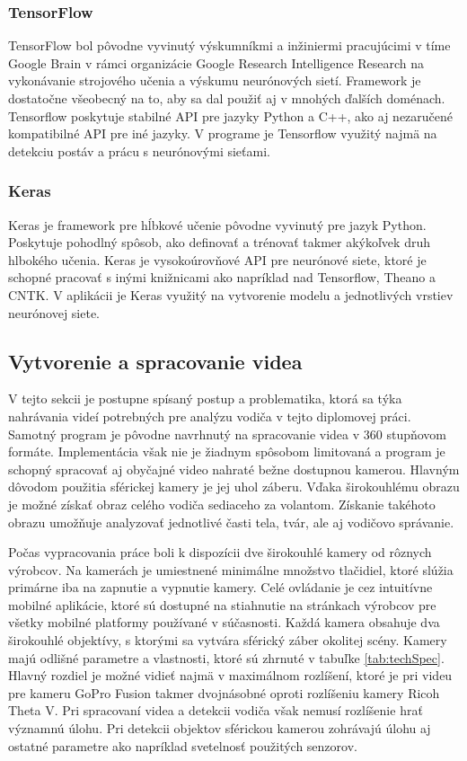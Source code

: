 \documentclass[slovak,master,dept460,male,cpp,cpdeclaration]{diploma}
\begin{document}
\subsubsection*{TensorFlow}
TensorFlow\cite{tensorflow2015-whitepaper} bol pôvodne vyvinutý výskumníkmi a inžiniermi pracujúcimi v tíme Google Brain v rámci organizácie Google Research Intelligence Research na vykonávanie strojového učenia a výskumu neurónových sietí. Framework je dostatočne všeobecný na to, aby sa dal použiť aj v mnohých ďalších doménach. Tensorflow poskytuje stabilné API  pre jazyky Python a C++, ako aj nezaručené kompatibilné API pre iné jazyky. V programe je Tensorflow využitý najmä na detekciu postáv a prácu s neurónovými sieťami.

\subsubsection*{Keras}
Keras\cite{chollet2015keras} je framework pre hĺbkové učenie pôvodne vyvinutý pre jazyk Python. Poskytuje pohodlný spôsob, ako definovať a trénovať takmer akýkoľvek druh hlbokého učenia. Keras je vysokoúrovňové API pre neurónové siete, ktoré je schopné pracovať s inými knižnicami ako napríklad nad Tensorflow, Theano\cite{theano} a CNTK. V aplikácii je Keras využitý na vytvorenie modelu a jednotlivých vrstiev neurónovej siete.

\subsection{Vytvorenie a spracovanie videa}
V tejto sekcii je postupne spísaný postup a problematika, ktorá sa týka nahrávania videí potrebných pre analýzu vodiča v tejto diplomovej práci. Samotný program je pôvodne navrhnutý na spracovanie videa v 360 stupňovom formáte. Implementácia však nie je žiadnym spôsobom limitovaná a program je schopný spracovať aj obyčajné video nahraté bežne dostupnou kamerou. Hlavným dôvodom použitia  sférickej kamery je jej uhol záberu. Vďaka širokouhlému obrazu je možné získať obraz celého vodiča sediaceho za volantom. Získanie takéhoto obrazu umožňuje analyzovať jednotlivé časti tela, tvár, ale aj vodičovo správanie.\par
 Počas vypracovania práce boli k dispozícii dve širokouhlé kamery od rôznych výrobcov. Na kamerách je umiestnené minimálne množstvo tlačidiel, ktoré slúžia primárne iba na zapnutie a vypnutie kamery. Celé ovládanie je cez intuitívne mobilné aplikácie, ktoré sú dostupné na stiahnutie na stránkach výrobcov pre všetky mobilné platformy používané v súčasnosti. Každá kamera obsahuje dva širokouhlé objektívy, s ktorými sa vytvára sférický záber okolitej scény. Kamery majú odlišné parametre a vlastnosti, ktoré sú zhrnuté v tabuľke \ref{tab:techSpec}. Hlavný rozdiel je možné vidieť najmä v maximálnom rozlíšení, ktoré je pri videu pre kameru GoPro Fusion takmer dvojnásobné oproti rozlíšeniu kamery Ricoh Theta V. Pri spracovaní videa a detekcii vodiča však nemusí rozlíšenie hrať významnú úlohu. Pri detekcii objektov sférickou kamerou zohrávajú úlohu aj ostatné parametre ako napríklad svetelnosť použitých senzorov.
\end{document}
